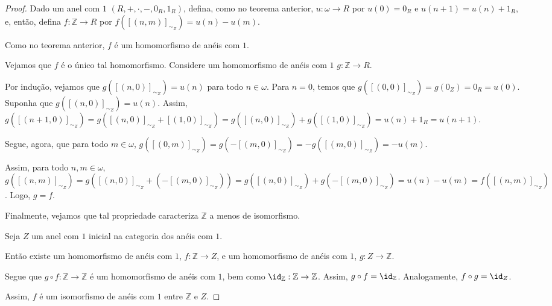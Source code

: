 \begin{proof}
    Dado um anel com $1$ $(R, +, \cdot, -, 0_R, 1_R)$, defina, como no teorema anterior, $u: \omega\to R$ por $u(0)=0_R$ e $u(n+1)=u(n)+1_R$, e, então, defina $f:\mathbb Z\to R$ por $f([(n, m)]_{\sim_Z})=u(n)-u(m)$.

    Como no teorema anterior, $f$ é um homomorfismo de anéis com $1$.

    Vejamos que $f$ é o único tal homomorfismo.
    Considere um homomorfismo de anéis com $1$ $g:\mathbb Z\to R$.

    Por indução, vejamos que $g([(n, 0)]_{\sim_Z})=u(n)$ para todo $n\in \omega$.
    Para $n=0$, temos que $g([(0, 0)]_{\sim_Z})=g(0_Z)=0_R=u(0)$.
    Suponha que $g([(n, 0)]_{\sim_Z})=u(n)$.
    Assim, $g([(n+1, 0)]_{\sim_Z})=g([(n, 0)]_{\sim_Z}+[(1, 0)]_{\sim_Z})=g([(n, 0)]_{\sim_Z})+g([(1, 0)]_{\sim_Z})=u(n)+1_R=u(n+1)$.

    Segue, agora, que para todo $m \in \omega$, $g([(0, m)]_{\sim_Z})=g(-[(m, 0)]_{\sim_Z})=-g([(m, 0)]_{\sim_Z})=-u(m)$.

    Assim, para todo $n, m \in \omega$, $g([(n, m)]_{\sim_Z})=g([(n, 0)]_{\sim_Z}+(-[(m, 0)]_{\sim_Z}))=g([(n, 0)]_{\sim_Z})+g(-[(m, 0)]_{\sim_Z})=u(n)-u(m)=f([(n, m)]_{\sim_Z})$.
    Logo, $g=f$.

    Finalmente, vejamos que tal propriedade caracteriza $\mathbb Z$ a menos de isomorfismo.

    Seja $Z$ um anel com $1$ inicial na categoria dos anéis com $1$.

    Então existe um homomorfismo de anéis com $1$, $f:\mathbb Z\to Z$, e um homomorfismo de anéis com $1$, $g:Z\to \mathbb Z$.

    Segue que $g\circ f:\mathbb Z\to \mathbb Z$ é um homomorfismo de anéis com $1$, bem como $\id_{\mathbb Z}:\mathbb Z\to \mathbb Z$.
    Assim, $g\circ f=\id_{\mathbb Z}$.
    Analogamente, $f\circ g=\id_Z$.

    Assim, $f$ é um isomorfismo de anéis com $1$ entre $\mathbb Z$ e $Z$.
\end{proof}